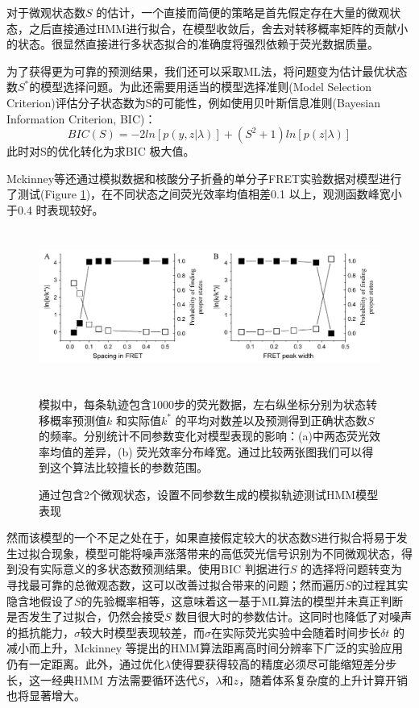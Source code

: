 \documentclass[11pt, a4paper]{article}
\begin{document}

对于微观状态数$S$ 的估计，一个直接而简便的策略是首先假定存在大量的微观状态，之后直接通过HMM进行拟合，在模型收敛后，舍去对转移概率矩阵的贡献小的状态。很显然直接进行多状态拟合的准确度将强烈依赖于荧光数据质量。

为了获得更为可靠的预测结果，我们还可以采取ML法，将问题变为估计最优状态数$S^*$的模型选择问题。为此还需要用适当的模型选择准则(Model Selection Criterion)评估分子状态数为S的可能性，例如使用贝叶斯信息准则(Bayesian Information Criterion, BIC)：
\begin{equation}
BIC(S)=-2ln[p(y,z|\lambda)]+(S^2+1)ln[p(z|\lambda)]
\end{equation}
此时对S的优化转化为求BIC 极大值。

Mckinney等还通过模拟数据和核酸分子折叠的单分子FRET实验数据对模型进行了测试(Figure \ref{fig:test})，在不同状态之间荧光效率均值相差0.1 以上，观测函数峰宽小于0.4 时表现较好。

\begin{figure}[htb]
  \centering
  \includegraphics[height=5cm]{Fig_test.PNG}\\
  \caption{通过包含2个微观状态，设置不同参数生成的模拟轨迹测试HMM模型表现}%
  \label{fig:test}
  \small\flushleft
  模拟中，每条轨迹包含1000步的荧光数据，左右纵坐标分别为状态转移概率预测值$k$ 和实际值$k^*$ 的平均对数差以及预测得到正确状态数$S$的频率。分别统计不同参数变化对模型表现的影响：(a)中两态荧光效率均值的差异，(b) 荧光效率分布峰宽。通过比较两张图我们可以得到这个算法比较擅长的参数范围。
\end{figure}

然而该模型的一个不足之处在于，如果直接假定较大的状态数S进行拟合将易于发生过拟合现象，模型可能将噪声涨落带来的高低荧光信号识别为不同微观状态，得到没有实际意义的多状态数预测结果。使用BIC 判据进行$S$ 的选择将问题转变为寻找最可靠的总微观态数，这可以改善过拟合带来的问题；然而遍历$S$的过程其实隐含地假设了$S$的先验概率相等，这意味着这一基于ML算法的模型并未真正判断是否发生了过拟合，仍然会接受$S$ 数目很大时的参数估计。这同时也降低了对噪声的抵抗能力，$\sigma$较大时模型表现较差，而$\sigma$在实际荧光实验中会随着时间步长$\delta t$ 的减小而上升，Mckinney 等提出的HMM算法距离高时间分辨率下广泛的实验应用仍有一定距离。此外，通过优化$\lambda$使得要获得较高的精度必须尽可能缩短差分步长，这一经典HMM 方法需要循环迭代$S$，$\lambda$和$z$，随着体系复杂度的上升计算开销也将显著增大。
\end{document}

